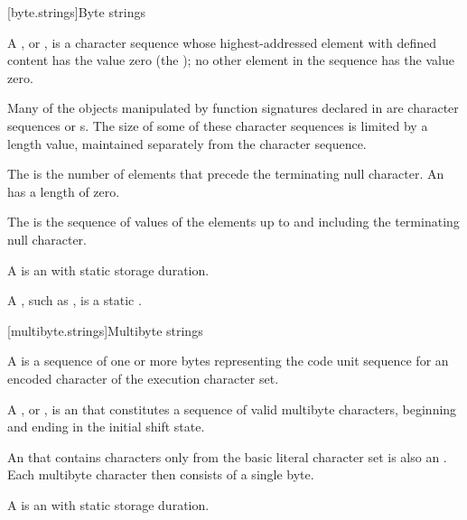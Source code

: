 [byte.strings]{Byte strings}

%
\pnum
A ,
or \ntbs{},
is a character sequence whose highest-addressed element
with defined content has the value zero
(the );
no other element in the sequence has the value zero.
\begin{footnote}
Many of the objects manipulated by
function signatures declared in
 are character sequences or \ntbs{}s.
The size of some of these character sequences is limited by
a length value, maintained separately from the character sequence.
\end{footnote}

\pnum
The 
is the number of elements that
precede the terminating null character.
An 
has a length of zero.

\pnum
The 
is the sequence of values of the
elements up to and including the terminating null character.

\pnum
A 
is an \ntbs{} with
static storage duration.
\begin{footnote}
A , such as
,
is a static \ntbs{}.
\end{footnote}

[multibyte.strings]{Multibyte strings}

\pnum
A  is
a sequence of one or more bytes representing the
code unit sequence for an encoded character of the
execution character set.

%
\pnum
A ,
or \ntmbs{},
is an \ntbs{} that constitutes a
sequence of valid multibyte characters, beginning and ending in the initial
shift state.
\begin{footnote}
An \ntbs{} that contains characters only from the
basic literal character set is also an \ntmbs{}.
Each multibyte character then
consists of a single byte.
\end{footnote}

\pnum
A 
is an \ntmbs{} with static storage duration.

